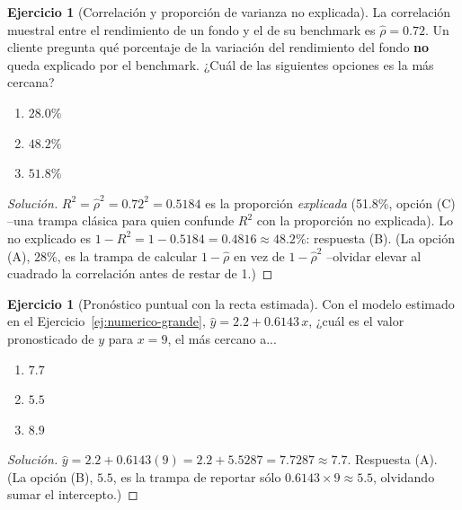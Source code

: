 \documentclass[11pt,a4paper,oneside]{article}
\theoremstyle{plain}
\theoremstyle{definition}
\newtheorem{exercise}[teorema]{Ejercicio}
\begin{document}
\begin{exercise}[Correlación y proporción de varianza no explicada]\label{ej:cfa-r2}
La correlación muestral entre el rendimiento de un fondo y el de su
benchmark es $\hat\rho=0.72$. Un cliente pregunta qué porcentaje de la
variación del rendimiento del fondo \textbf{no} queda explicado por el
benchmark. ¿Cuál de las siguientes opciones es la más cercana?
\begin{enumerate}[label=(\Alph*),nosep,leftmargin=2.2em]
  \item $28.0\%$
  \item $48.2\%$
  \item $51.8\%$
\end{enumerate}
\end{exercise}
\begin{proof}[Solución]
$R^2=\hat\rho^2=0.72^2=0.5184$ es la proporción \emph{explicada}
(51.8\%, opción (C) --una trampa clásica para quien confunde $R^2$ con
la proporción no explicada). Lo no explicado es
$1-R^2=1-0.5184=0.4816\approx48.2\%$: respuesta (B). (La opción (A),
$28\%$, es la trampa de calcular $1-\hat\rho$ en vez de $1-\hat\rho^2$
--olvidar elevar al cuadrado la correlación antes de restar de 1.)
\end{proof}

\begin{exercise}[Pronóstico puntual con la recta estimada]\label{ej:cfa-pronostico}
Con el modelo estimado en el Ejercicio~\ref{ej:numerico-grande},
$\hat y = 2.2+0.6143\,x$, ¿cuál es el valor pronosticado de $y$ para
$x=9$, el más cercano a...
\begin{enumerate}[label=(\Alph*),nosep,leftmargin=2.2em]
  \item $7.7$
  \item $5.5$
  \item $8.9$
\end{enumerate}
\end{exercise}
\begin{proof}[Solución]
$\hat y = 2.2+0.6143(9) = 2.2+5.5287 = 7.7287\approx7.7$. Respuesta (A).
(La opción (B), $5.5$, es la trampa de reportar sólo
$0.6143\times9\approx5.5$, olvidando sumar el intercepto.)
\end{proof}
\end{document}
